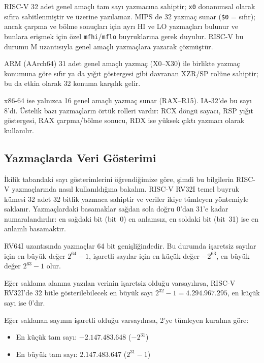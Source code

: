 \begin{karsilastirma}
RISC-V 32 adet genel amaçlı tam sayı yazmacına sahiptir; \texttt{x0} donanımsal olarak sıfıra sabitlenmiştir ve üzerine yazılamaz. MIPS de 32 yazmaç sunar (\texttt{\$0} = sıfır); ancak çarpma ve bölme sonuçları için ayrı HI ve LO yazmaçları bulunur ve bunlara erişmek için özel \texttt{mfhi}/\texttt{mflo} buyruklarına gerek duyulur. RISC-V bu durumu M uzantısıyla genel amaçlı yazmaçlara yazarak çözmüştür.

ARM (AArch64) 31 adet genel amaçlı yazmaç (X0--X30) ile birlikte yazmaç konumuna göre sıfır ya da yığıt göstergesi gibi davranan XZR/SP rolüne sahiptir; bu da etkin olarak 32 konuma karşılık gelir.

x86-64 ise yalnızca 16 genel amaçlı yazmaç sunar (RAX--R15). IA-32'de bu sayı 8'di. Üstelik bazı yazmaçların örtük rolleri vardır: RCX döngü sayacı, RSP yığıt göstergesi, RAX çarpma/bölme sonucu, RDX ise yüksek çıktı yazmacı olarak kullanılır.
\end{karsilastirma}

\subsection{Yazmaçlarda Veri Gösterimi}
\label{sec:riscv-veri}

İkilik tabandaki sayı gösterimlerini öğrendiğimize göre, şimdi bu bilgilerin RISC-V yazmaçlarında nasıl kullanıldığına bakalım. RISC-V RV32I temel buyruk kümesi 32 adet 32 bitlik yazmaca sahiptir ve veriler ikiye tümleyen yöntemiyle saklanır. Yazmaçlardaki basamaklar sağdan sola doğru 0'dan 31'e kadar numaralandırılır: en sağdaki bit (bit~0) en anlamsız, en soldaki bit (bit~31) ise en anlamlı basamaktır.

\begin{bilginot}
RV64I uzantısında yazmaçlar 64 bit genişliğindedir. Bu durumda işaretsiz sayılar için en büyük değer $2^{64}-1$, işaretli sayılar için en küçük değer $-2^{63}$, en büyük değer $2^{63}-1$ olur.
\end{bilginot}

Eğer saklama alanına yazılan verinin işaretsiz olduğu varsayılırsa, RISC-V RV32I'de 32 bitle gösterilebilecek en büyük sayı $2^{32}-1 = 4.294.967.295$, en küçük sayı ise $0$'dır.

Eğer saklanan sayının işaretli olduğu varsayılırsa, 2'ye tümleyen kuralına göre:
\begin{itemize}
\item En küçük tam sayı: $-2.147.483.648$ ($-2^{31}$)
\item En büyük tam sayı: $2.147.483.647$ ($2^{31}-1$)
\end{itemize}

